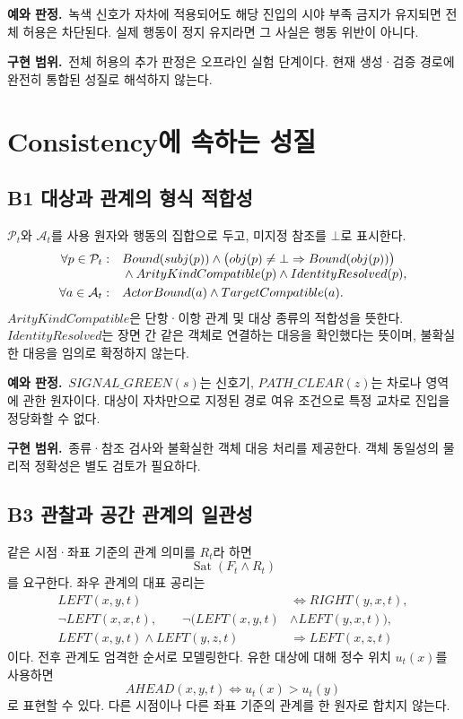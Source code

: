\documentclass[11pt,a4paper]{article}
\newcommand{\sat}{\operatorname{Sat}}
\newcommand{\example}{\par\textbf{예와 판정.}\ }
\newcommand{\impl}{\par\textbf{구현 범위.}\ }
\begin{document}
\example 녹색 신호가 자차에 적용되어도 해당 진입의 시야 부족 금지가 유지되면
전체 허용은 차단된다. 실제 행동이 정지 유지라면 그 사실은 행동 위반이 아니다.
\impl 전체 허용의 추가 판정은 오프라인 실험 단계이다.
현재 생성·검증 경로에 완전히 통합된 성질로 해석하지 않는다.

\section{Consistency에 속하는 성질}
\subsection{B1 대상과 관계의 형식 적합성}\label{prop:b1}
$\mathcal{P}_t$와 $\mathcal{A}_t$를 사용 원자와 행동의 집합으로 두고,
미지정 참조를 $\bot$로 표시한다.
\begin{align}
 \forall p\in\mathcal{P}_t:\quad
 &Bound(subj(p))\land\bigl(obj(p)\ne\bot\Rightarrow Bound(obj(p))\bigr)\notag\\[-0.3em]
 &\land ArityKindCompatible(p)\land IdentityResolved(p),\label{eq:b1atom}\\
 \forall a\in\mathcal{A}_t:\quad
 &ActorBound(a)\land TargetCompatible(a).\label{eq:b1action}
\end{align}
$ArityKindCompatible$은 단항·이항 관계 및 대상 종류의 적합성을 뜻한다.
$IdentityResolved$는 장면 간 같은 객체로 연결하는 대응을 확인했다는 뜻이며,
불확실한 대응을 임의로 확정하지 않는다.

\example $SIGNAL\_GREEN(s)$는 신호기,
$PATH\_CLEAR(z)$는 차로나 영역에 관한 원자이다.
대상이 자차만으로 지정된 경로 여유 조건으로 특정 교차로 진입을 정당화할 수 없다.
\impl 종류·참조 검사와 불확실한 객체 대응 처리를 제공한다.
객체 동일성의 물리적 정확성은 별도 검토가 필요하다.

\subsection{B3 관찰과 공간 관계의 일관성}\label{prop:b3}
같은 시점·좌표 기준의 관계 의미를 $R_t$라 하면
\begin{equation}
 \sat(F_t\land R_t)\label{eq:b3}
\end{equation}
를 요구한다. 좌우 관계의 대표 공리는
\begin{align}
 LEFT(x,y,t)&\Leftrightarrow RIGHT(y,x,t),\\
 \neg LEFT(x,x,t),\qquad
 \neg\bigl(LEFT(x,y,t)&\land LEFT(y,x,t)\bigr),\\
 LEFT(x,y,t)\land LEFT(y,z,t)&\Rightarrow LEFT(x,z,t)
\end{align}
이다. 전후 관계도 엄격한 순서로 모델링한다.
유한 대상에 대해 정수 위치 $u_t(x)$를 사용하면
\begin{equation}
 AHEAD(x,y,t)\Leftrightarrow u_t(x)>u_t(y)
\end{equation}
로 표현할 수 있다. 다른 시점이나 다른 좌표 기준의 관계를 한 원자로 합치지 않는다.
\end{document}
